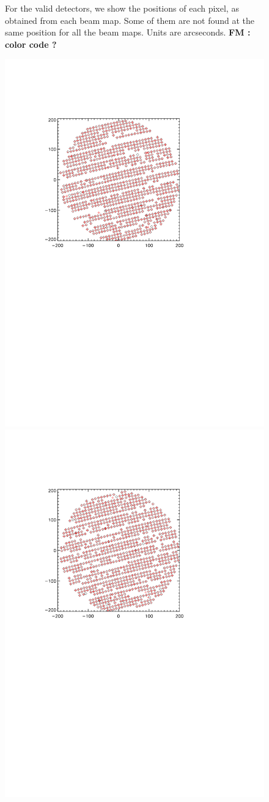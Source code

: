 \begin{figure}[htp]
\begin{center}
\caption[Stability of KID positions in the field-of-view]{For the valid detectors, we show the positions of each pixel, as obtained from 
each beam map. Some of them are not found at the 
same position for all the beam maps. Units are arcseconds. {\bf FM : color code ?}}
\label{fig:jumping_kids}
\end{center}
\end{figure}

\begin{figure}[htp]
\begin{center}
\includegraphics[trim=2cm 14cm 5cm 4cm, clip=true,width=0.55\linewidth]{Figures/A1_test_positions.pdf}
\includegraphics[trim=2cm 14cm 5cm 4cm, clip=true,width=0.55\linewidth]{Figures/A3_test_positions.pdf}

\end{center}
\end{figure}
